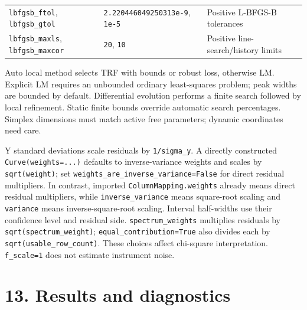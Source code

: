 \documentclass[
  10pt,
  a4paper,
  oneside]{scrreprt}
\begin{document}
\begin{longtable}[]{@{}lll@{}}
\begin{minipage}[t]{0.30\columnwidth}
\texttt{lbfgsb\_ftol}, \texttt{lbfgsb\_gtol}\strut
\end{minipage} & \begin{minipage}[t]{0.30\columnwidth}\raggedright
\texttt{2.220446049250313e-9}, \texttt{1e-5}\strut
\end{minipage} & \begin{minipage}[t]{0.30\columnwidth}\raggedright
Positive L-BFGS-B tolerances\strut
\end{minipage}\tabularnewline
\begin{minipage}[t]{0.30\columnwidth}\raggedright
\texttt{lbfgsb\_maxls}, \texttt{lbfgsb\_maxcor}\strut
\end{minipage} & \begin{minipage}[t]{0.30\columnwidth}\raggedright
\texttt{20}, \texttt{10}\strut
\end{minipage} & \begin{minipage}[t]{0.30\columnwidth}\raggedright
Positive line-search/history limits\strut
\end{minipage}\tabularnewline
\bottomrule
\end{longtable}

Auto local method selects TRF with bounds or robust loss, otherwise LM.
Explicit LM requires an unbounded ordinary least-squares problem; peak
widths are bounded by default. Differential evolution performs a finite
search followed by local refinement. Static finite bounds override
automatic search percentages. Simplex dimensions must match active free
parameters; dynamic coordinates need care.

Y standard deviations scale residuals by \texttt{1/sigma\_y}. A directly
constructed \texttt{Curve(weights=...)} defaults to inverse-variance
weights and scales by \texttt{sqrt(weight)}; set
\texttt{weights\_are\_inverse\_variance=False} for direct residual
multipliers. In contrast, imported \texttt{ColumnMapping.weights}
already means direct residual multipliers, while
\texttt{inverse\_variance} means square-root scaling and
\texttt{variance} means inverse-square-root scaling. Interval
half-widths use their confidence level and residual side.
\texttt{spectrum\_weights} multiplies residuals by
\texttt{sqrt(spectrum\_weight)}; \texttt{equal\_contribution=True} also
divides each by \texttt{sqrt(usable\_row\_count)}. These choices affect
chi-square interpretation. \texttt{f\_scale=1} does not estimate
instrument noise.

\hypertarget{results-and-diagnostics}{%
\section{13. Results and diagnostics}\label{results-and-diagnostics}}
\end{document}
